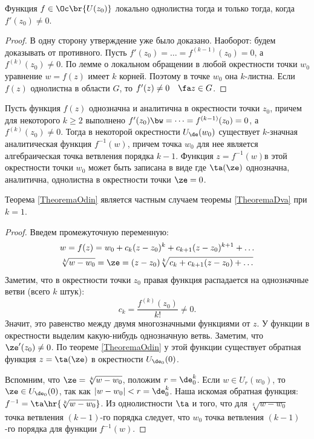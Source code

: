 \documentclass[a4paper]{article}
\begin{document}
\begin{theorem}
\begin{imp}
Функция $f \in \Oc\br{U(z_0)}$ локально однолистна тогда и только тогда, когда $f'(z_0)\neq 0$.
\end{imp}
\begin{proof}
В одну сторону утверждение уже было доказано. Наоборот: будем доказывать от противного. Пусть
$f'(z_0)=\dots = f^{(k-1)}(z_0)=0$, а $f^{(k)}(z_0)\neq 0$.
По лемме о локальном обращении в любой окрестности точки $w_0$ уравнение
$w=f(z)$ имеет $k$ корней. Поэтому в точке $w_0$ она $k$-листна.
Если $f(z)$ однолистна в области $G$, то $f'(z)\neq 0 \quad \fa z\in G$.
\end{proof}

\begin{theorem}\label{TheoremaDva}
Пусть функция $f(z)$ однозначна и аналитична в окрестности точки $z_0$, причем для некоторого $k\ge 2$
выполнено $f'(z_0)\bw=\dots =f^{(k-1)}(z_0)=0$, а $f^{(k)}(z_0)\neq 0$. Тогда в некоторой окрестности
$U_\de(w_0)$ существует $k$-значная аналитическая функция $f^{-1}(w)$, причем точка
$w_0$ для нее является алгебраическая точка ветвления порядка $k-1$. Функция $z=f^{-1}(w)$в этой
окрестности точки $w_0$ может быть записана в виде
где $\ta(\ze)$ однозначна, аналитична, однолистна в окрестности точки $\ze=0$.
\end{theorem}

\begin{note}
Теорема \ref{TheoremaOdin} является частным случаем теоремы \ref{TheoremaDva} при $k=1$.
\end{note}

\begin{proof}
Введем промежуточную переменную:
\begin{gather*}
w=f(z)=w_0+c_k(z-z_0)^k+c_{k+1}(z-z_0)^{k+1}+\dots\\
\sqrt[k]{w-w_0}=\ze=(z-z_0)\sqrt[k]{c_k+c_{k+1}(z-z_0)+\dots}
\end{gather*}
Заметим,  что в окрестности точки $z_0$ правая функция распадается на однозначные ветви (всего $k$ штук):
$$c_k=\frac{f^{(k)}(z_0)}{k!}\neq 0.$$
Значит, это равенство между двумя многозначными функциями от $z$. У функции
в окрестности выделим какую-нибудь однозначную ветвь. Заметим, что $\ze'(z_0)\neq 0$. По теореме \ref{TheoremaOdin}
у этой функции существует обратная функция $z=\ta(\ze)$ в окрестности $U_{\de_0}(0)$.

Вспомним, что $\ze = \sqrt[k]{w-w_0}$, положим $r = \de_0^k$. Если $w \in U_r(w_0)$, то
$\ze\in U_{\de_0}(0)$, так как $|w-w_0| < r = \de_0^k$. Наша искомая обратная функция:
$f^{-1} = \ta\hr{\sqrt[k]{w-w_0}}$. Из однолистности $\ta$ и того, что для
$\sqrt[k]{w-w_0}$ точка ветвления $(k-1)$-го порядка следует, что $w_0$ точка
ветвления $(k-1)$-го порядка для функции $f^{-1}(w)$.
\end{proof}


\end{theorem}
\end{document}
